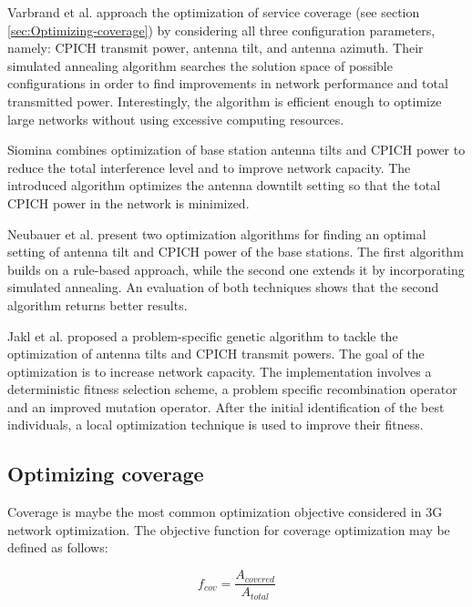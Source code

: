 Varbrand et al. \cite{Coverage.optimization.on.CPICH.tilt.and.azimuth:2006}
approach the optimization of service coverage (see section \ref{sec:Optimizing-coverage})
by considering all three configuration parameters, namely: CPICH transmit
power, antenna tilt, and antenna azimuth. Their simulated annealing
algorithm searches the solution space of possible configurations in
order to find improvements in network performance and total transmitted
power. Interestingly, the algorithm is efficient enough to optimize
large networks without using excessive computing resources.

Siomina \cite{CPICH.and.antenna.tilt.optimization:2005} combines
optimization of base station antenna tilts and CPICH power to reduce
the total interference level and to improve network capacity. The
introduced algorithm optimizes the antenna downtilt setting so that
the total CPICH power in the network is minimized.

Neubauer et al. \cite{Antenna.tilt.and.CPICH:2003} present two optimization
algorithms for finding an optimal setting of antenna tilt and CPICH
power of the base stations. The first algorithm builds on a rule-based
approach, while the second one extends it by incorporating simulated
annealing. An evaluation of both techniques shows that the second
algorithm returns better results.

Jakl et al. \cite{GA.for.tilt.and.CPICH:2004} proposed a problem-specific
genetic algorithm to tackle the optimization of antenna tilts and
CPICH transmit powers. The goal of the optimization is to increase
network capacity. The implementation involves a deterministic fitness
selection scheme, a problem specific recombination operator and an
improved mutation operator. After the initial identification of the
best individuals, a local optimization technique is used to improve
their fitness.


\subsection{Optimizing coverage \label{sec:Optimizing-coverage}}

Coverage is maybe the most common optimization objective considered
in 3G network optimization. The objective function for coverage optimization
may be defined as follows:

\[
f_{cov}=\frac{A_{covered}}{A_{total}}
\]



